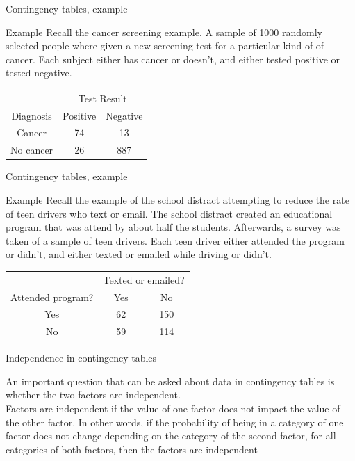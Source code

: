 \documentclass[xcolor=table]{beamer}
\begin{document}
\begin{frame}{Contingency tables, example}
\large
\begin{exampleblock}{Example}
Recall the cancer screening example. A sample of 1000 randomly selected people where given a new screening test for a particular kind of of cancer. Each subject either has cancer or doesn't, and either tested positive or tested negative.\\
\medskip
{\centering
\begin{tabular}{c | c  c}
\multicolumn{1}{c}{} & \multicolumn{2}{c}{Test Result}\\
Diagnosis & Positive & Negative\\
\hline
Cancer & 74 & 13\\
No cancer & 26 & 887 \\
\end{tabular}
\par}
\smallskip

\end{exampleblock}
\end{frame}

\begin{frame}{Contingency tables, example}
\begin{exampleblock}{Example}
\large
Recall the example of the school distract attempting to reduce the rate of teen drivers who text or email. The school distract created an educational program that was attend by about half the students. Afterwards, a survey was taken of a sample of teen drivers. Each teen driver either attended the program or didn't, and either texted or emailed while driving or didn't.\\
\medskip
{\centering
\begin{tabular}{c | c  c}
\multicolumn{1}{c}{} & \multicolumn{2}{c}{Texted or emailed?}\\
Attended program? & Yes & No\\
\hline
Yes & 62 & 150\\
No & 59 & 114 \\
\end{tabular}
\par}
\smallskip

\end{exampleblock}
\end{frame}


\begin{frame}{Independence in contingency tables}
\begin{block}{}
\large
An important question that can be asked about data in contingency tables is whether the two factors are independent.\\
\pause\medskip
Factors are independent if the value of one factor does not impact the value of the other factor. In other words, if the probability of being in a category of one factor does not change depending on the category of the second factor, for all categories of both factors, then the factors are independent 
\end{block}
\end{frame}
\end{document}
